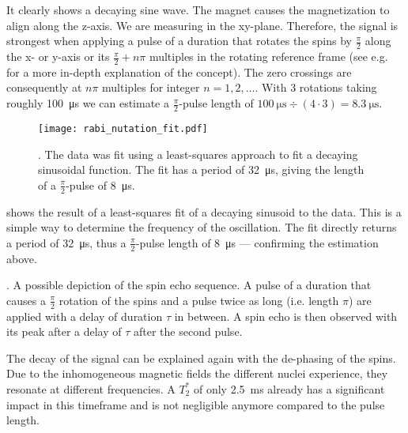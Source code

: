 It clearly shows a decaying sine wave. The magnet causes the magnetization to align along the z-axis. We are measuring in the xy-plane. Therefore, the signal is strongest when applying a pulse of a duration that rotates the spins by \(\frac{\pi}{2}\) along the x- or y-axis or its \(\frac{\pi}{2} + n\pi{}\) multiples in the rotating reference frame (see e.g.  for a more in-depth explanation of the concept). The zero crossings are consequently at \(n\pi{}\) multiples for integer \(n = 1,2,\ldots\). With 3 rotations taking roughly \qty{100}{\micro\second} we can estimate a \(\frac{\pi}{2}\)-pulse length of \(\qty{100}{\micro\second}\div (4 \cdot 3) = \qty{8.3}{\micro\second}\).

\begin{figure}[h!bt]
    \centering
    \texttt{[image: rabi\_nutation\_fit.pdf]}
    \caption{. The data was fit using a least-squares approach to fit a decaying sinusoidal function. The fit has a period of \qty{32}{\micro\second}, giving the length of a $\frac{\pi}{2}$-pulse of \qty{8}{\micro\second}.}
\end{figure}

 shows the result of a least-squares fit of a decaying sinusoid to the data. This is a simple way to determine the frequency of the oscillation. The fit directly returns a period of \qty{32}{\micro\second}, thus a \(\frac{\pi}{2}\)-pulse length of \qty{8}{\micro\second} --- confirming the estimation above.

\begin{marginfigure}
    \centering
    
    \caption{. A possible depiction of the spin echo sequence. A pulse of a duration that causes a \(\frac{\pi}{2}\) rotation of the spins and a pulse twice as long (i.e. length \(\pi\)) are applied with a delay of duration \(\tau\) in between. A spin echo is then observed with its peak after a delay of \(\tau\) after the second pulse.}
\end{marginfigure}

The decay of the signal can be explained again with the de-phasing of the spins. Due to the inhomogeneous magnetic fields the different nuclei experience, they resonate at different frequencies. A \(T_2^*\) of only \qty{2.5}{\milli\second} already has a significant impact in this timeframe and is not negligible anymore compared to the pulse length.

